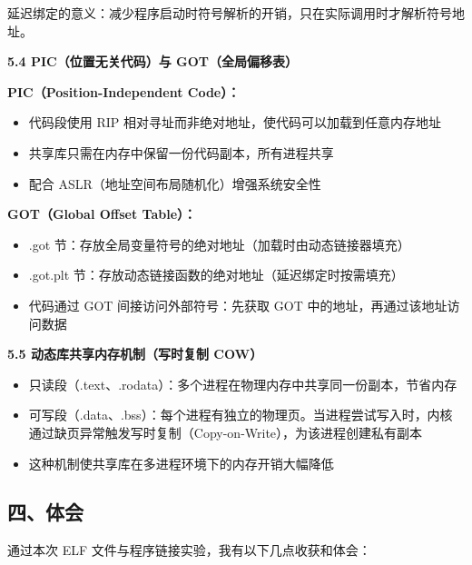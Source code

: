 \documentclass[12pt,a4paper]{ctexart}
\begin{document}
延迟绑定的意义：减少程序启动时符号解析的开销，只在实际调用时才解析符号地址。

\textbf{5.4 PIC（位置无关代码）与 GOT（全局偏移表）}

\textbf{PIC（Position-Independent Code）：}
\begin{itemize}[nosep]
    \item 代码段使用 RIP 相对寻址而非绝对地址，使代码可以加载到任意内存地址
    \item 共享库只需在内存中保留一份代码副本，所有进程共享
    \item 配合 ASLR（地址空间布局随机化）增强系统安全性
\end{itemize}

\textbf{GOT（Global Offset Table）：}
\begin{itemize}[nosep]
    \item .got 节：存放全局变量符号的绝对地址（加载时由动态链接器填充）
    \item .got.plt 节：存放动态链接函数的绝对地址（延迟绑定时按需填充）
    \item 代码通过 GOT 间接访问外部符号：先获取 GOT 中的地址，再通过该地址访问数据
\end{itemize}

\textbf{5.5 动态库共享内存机制（写时复制 COW）}

\begin{itemize}[nosep]
    \item 只读段（.text、.rodata）：多个进程在物理内存中共享同一份副本，节省内存
    \item 可写段（.data、.bss）：每个进程有独立的物理页。当进程尝试写入时，内核通过缺页异常触发写时复制（Copy-on-Write），为该进程创建私有副本
    \item 这种机制使共享库在多进程环境下的内存开销大幅降低
\end{itemize}

\subsection*{四、体会}

通过本次 ELF 文件与程序链接实验，我有以下几点收获和体会：
\end{document}
